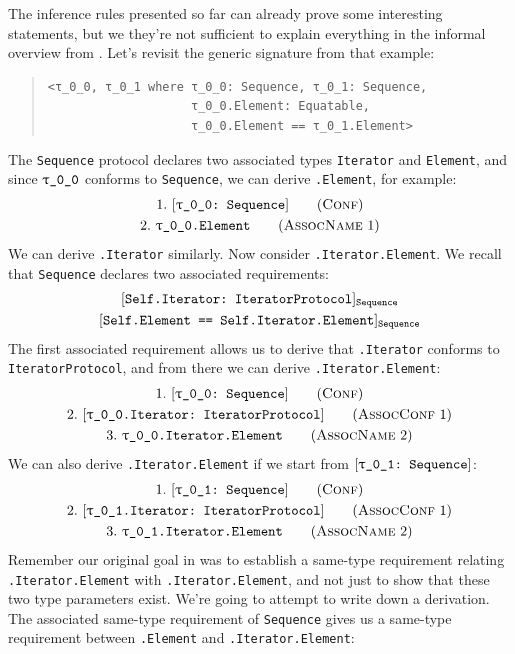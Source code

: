 \documentclass[../generics]{subfiles}
\begin{document}
\begin{example}\label{motivating derived equiv}
The inference rules presented so far can already prove some interesting statements, but we they're not sufficient to explain everything in the informal overview from . Let's revisit the generic signature from that example:
\begin{quote}
\begin{verbatim}
<τ_0_0, τ_0_1 where τ_0_0: Sequence, τ_0_1: Sequence,
                    τ_0_0.Element: Equatable,
                    τ_0_0.Element == τ_0_1.Element>
\end{verbatim}
\end{quote}
The \texttt{Sequence} protocol declares two associated types \texttt{Iterator} and \texttt{Element}, and since $\rT$ conforms to \texttt{Sequence}, we can derive \texttt{\rT.Element}, for example:
\begin{gather*}
\ConfStep{\rT}{Sequence}{1}\\
\AssocNameStep{1}{\rT.Element}{2}
\end{gather*}
We can derive \texttt{\rT.Iterator} similarly. Now consider \texttt{\rT.Iterator.Element}. We recall that \texttt{Sequence} declares two associated requirements:
\begin{gather*}
\AssocConfReq{Self.Iterator}{IteratorProtocol}{Sequence}\\
\AssocSameReq{Self.Element}{Self.Iterator.Element}{Sequence}
\end{gather*}
The first associated requirement allows us to derive that \texttt{\rT.Iterator} conforms to \texttt{IteratorProtocol}, and from there we can derive \texttt{\rT.Iterator.Element}:
\begin{gather*}
\ConfStep{\rT}{Sequence}{1}\\
\AssocConfStep{1}{\rT.Iterator}{IteratorProtocol}{2}\\
\AssocNameStep{2}{\rT.Iterator.Element}{3}
\end{gather*}
We can also derive \texttt{\rU.Iterator.Element} if we start from $\rUSequence$:
\begin{gather*}
\ConfStep{\rU}{Sequence}{1}\\
\AssocConfStep{1}{\rU.Iterator}{IteratorProtocol}{2}\\
\AssocNameStep{2}{\rU.Iterator.Element}{3}
\end{gather*}
Remember our original goal in  was to establish a same-type requirement relating \texttt{\rT.Iterator.Element} with \texttt{\rU.Iterator.Element}, and not just to show that these two type parameters exist. We're going to attempt to write down a derivation. The associated same-type requirement of \texttt{Sequence} gives us a same-type requirement between \texttt{\rT.Element} and \texttt{\rT.Iterator.Element}:

\end{example}
\end{document}
